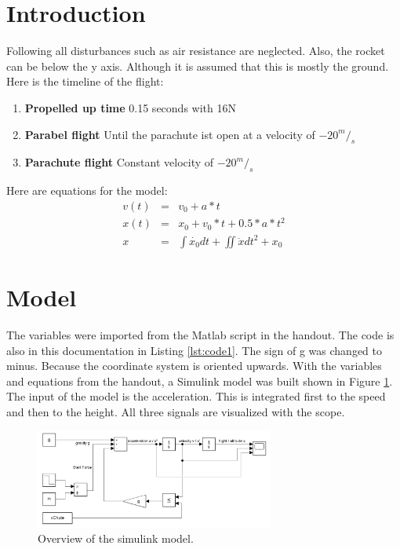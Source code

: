 %
%
%
\section{Introduction}
Following all disturbances such as air resistance are neglected. Also, the rocket can be below the y axis. Although it is assumed that this is mostly the ground.\\
Here is the timeline of the flight:

	\begin{enumerate}
		\item \textbf{Propelled up time} 0.15 seconds with 16N
		\item \textbf{Parabel flight} Until the parachute ist open at a velocity of $-20^m/_s$
		\item \textbf{Parachute flight} Constant velocity of $-20^m/_s$
	\end{enumerate}
Here are equations for the model:
	\begin{eqnarray}
		v\left( t\right)  &=& v_0 + a * t\\
		x\left( t\right)  &=& x_0 + v_0 * t + 0.5 * a * t^2\\
		x &=& \int \dot{x_0}  dt + \iint \ddot{x}  dt^2 + x_0
	\end{eqnarray}
	
	
	
	
\section{Model}\label{sec:model}
The variables were imported from the Matlab script in the handout. The code is also in this documentation in Listing \ref{lst:code1}.
The sign of g was changed to minus. Because the coordinate system is oriented upwards.
With the variables and equations from the handout, a Simulink model was built shown in Figure \ref{fig:overview}.
The input of the model is the acceleration. This is integrated first to the speed and then to the height. All three signals are visualized with the scope.
	


	\begin{figure}[H]
		\centering
		\includegraphics[width=0.7\textwidth]{figures/overview.png}
		\caption{Overview of the simulink model.}
		\label{fig:overview}
	\end{figure}

